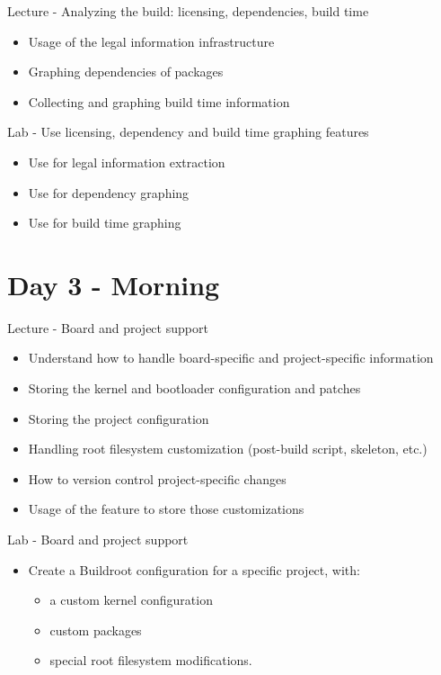 \documentclass[a4paper,12pt,obeyspaces,spaces,hyphens]{article}
\begin{document}
\feagendaonecolumn
{Lecture - Analyzing the build: licensing, dependencies, build time}
{
  \begin{itemize}
  \item Usage of the legal information infrastructure
  \item Graphing dependencies of packages
  \item Collecting and graphing build time information
  \end{itemize}
}
{Lab - Use licensing, dependency and build time graphing features}
{
  \begin{itemize}
  \item Use  for legal information extraction
  \item Use  for dependency graphing
  \item Use  for build time graphing
  \end{itemize}
}

\section{Day 3 - Morning}

\feagendatwocolumn
{Lecture - Board and project support}
{
  \begin{itemize}
  \item Understand how to handle board-specific and project-specific
    information
  \item Storing the kernel and bootloader configuration and patches
  \item Storing the project configuration
  \item Handling root filesystem customization (post-build script,
    skeleton, etc.)
  \item How to version control project-specific changes
  \item Usage of the  feature to store those
    customizations
  \end{itemize}
}
{Lab - Board and project support}
{
  \begin{itemize}
  \item Create a Buildroot configuration for a specific project, with:
    \begin{itemize}
    \item a custom kernel configuration
    \item custom packages
    \item special root filesystem modifications.
    \end{itemize}
  \end{itemize}
}
\end{document}
